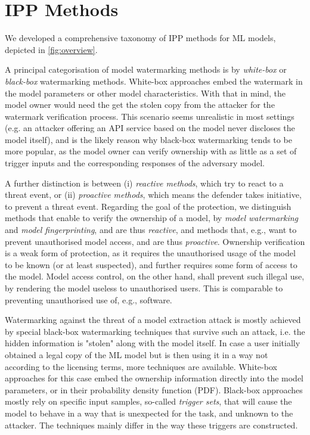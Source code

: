 \section{IPP Methods}
We developed a comprehensive taxonomy of IPP methods for ML models, depicted in \cref{fig:overview}.

A principal categorisation of model watermarking methods is by \textit{white-box} or \textit{black-box} watermarking methods. White-box approaches embed the watermark in the model parameters or other model characteristics. With that in mind, the model owner would need the get the stolen copy from the attacker for the watermark verification process. This scenario seems unrealistic in most settings (e.g. an attacker offering an API service based on the model never discloses the model itself), and is the likely reason why black-box watermarking tends to be more popular, as the model owner can verify ownership with as little as a set of trigger inputs and the corresponding responses of the adversary model.

A further distinction is between (i) \textit{reactive methods}, which try to react to a threat event, or (ii) \textit{proactive methods}, which means the defender takes initiative, to prevent a threat event.
Regarding the goal of the protection, we distinguish methods that enable to verify the ownership of a model, by \textit{model watermarking} and \textit{model fingerprinting}, and are thus \textit{reactive}, and methods that, e.g., want to prevent unauthorised model access, and are thus \textit{proactive}. %
Ownership verification is a weak form of protection, as it requires the unauthorised usage of the model to be known (or at least suspected), and further requires some form of access to the model. Model access control, on the other hand, shall prevent such illegal use, by rendering the model useless to unauthorised users. This is comparable to preventing unauthorised use of, e.g., software.

Watermarking against the threat of a model extraction attack is mostly achieved by special black-box watermarking techniques that survive such an attack, i.e. the hidden information is "stolen" along with the model itself. In case a user initially obtained a legal copy of the ML model but is then using it in a way not according to the licensing terms, more techniques are available. White-box approaches for this case embed the ownership information directly into the model parameters, or in their probability density function (PDF). Black-box approaches mostly rely on specific input samples, so-called \textit{trigger sets}, that will cause the model to behave in a way that is unexpected for the task, and unknown to the attacker. The techniques mainly differ in the way these triggers are constructed.

